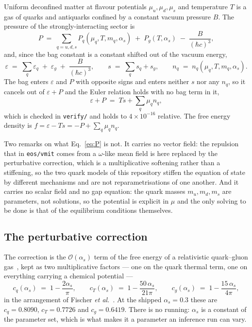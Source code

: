 \documentclass[aps,prc,onecolumn,superscriptaddress,nofootinbib,10pt]{revtex4-2}
\newcommand{\hc}{(\hbar c)^3}
\newcommand{\as}{\alpha_s}
\begin{document}
Uniform deconfined matter at flavour potentials $\mu_u, \mu_d, \mu_s$ and
temperature $T$ is a gas of quarks and antiquarks confined by a constant
vacuum pressure $B$. The pressure of the strongly-interacting sector is
%
\begin{equation}
P \;=\; \sum_{q = u,d,s} P_q(\mu_q, T, m_q, \as)
        \;+\; P_g(T, \as) \;-\; \frac{B}{\hc} ,
\label{eq:P}
\end{equation}
%
and, since the bag constant is a constant shifted out of the vacuum energy,
%
\begin{equation}
\varepsilon \;=\; \sum_q \varepsilon_q \;+\; \varepsilon_g
                  \;+\; \frac{B}{\hc} , \qquad
s \;=\; \sum_q s_q + s_g , \qquad
n_q \;=\; n_q(\mu_q, T, m_q, \as) .
\label{eq:eps}
\end{equation}
%
The bag enters $\varepsilon$ and $P$ with opposite signs and enters neither
$s$ nor any $n_q$, so it cancels out of $\varepsilon + P$ and the Euler
relation holds with no bag term in it,
%
\begin{equation}
\varepsilon + P \;=\; T s + \sum_q \mu_q n_q ,
\label{eq:euler}
\end{equation}
%
which is checked in \texttt{verify/} and holds to $4\times 10^{-16}$
relative. The free energy density is $f = \varepsilon - Ts = -P + \sum_q \mu_q
n_q$.

Two remarks on what Eq.~\eqref{eq:P} is not. It carries no vector field: the
repulsion that in \texttt{eos/vmit} comes from a $\omega$-like mean field is
here replaced by the perturbative correction, which is a multiplicative
softening rather than a stiffening, so the two quark models of this repository
stiffen the equation of state by different mechanisms and are not
reparametrisations of one another. And it carries no scalar field and no gap
equation: the quark masses $m_u, m_d, m_s$ are parameters, not solutions, so
the potential is explicit in $\mu$ and the only solving to be done is that of
the equilibrium conditions themselves.

\subsection{The perturbative correction}
\label{sec:alpha}

The correction is the $\mathcal{O}(\as)$ term of the free energy of a
relativistic quark--gluon gas~\cite{FreedmanMcLerran1977}, kept as two
multiplicative factors --- one on the quark thermal term, one on everything
carrying a chemical potential ---
%
\begin{equation}
c_q(\as) \;=\; 1 - \frac{2\as}{\pi} , \qquad
c_T(\as) \;=\; 1 - \frac{50\,\as}{21 \pi} , \qquad
c_g(\as) \;=\; 1 - \frac{15\,\as}{4 \pi} ,
\label{eq:cfactors}
\end{equation}
%
in the arrangement of Fischer \textit{et al.}~\cite{Fischer2011}. At the
shipped $\as = 0.3$ these are $c_q = 0.8090$, $c_T = 0.7726$ and
$c_g = 0.6419$. There is no running: $\as$ is a constant of the parameter set,
which is what makes it a parameter an inference run can vary.
\end{document}
